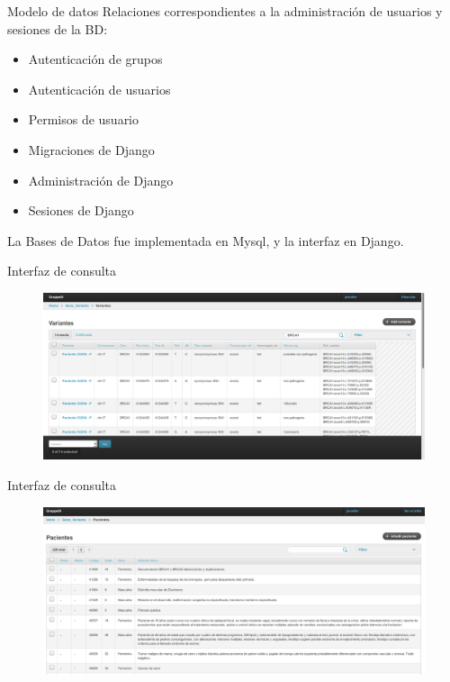 \documentclass[xcolor=dvipsnames]{beamer}
\begin{document}
\begin{frame}{Modelo de datos}
     Relaciones correspondientes a la administración de usuarios y sesiones de la BD:
    \begin{itemize}
    	\item Autenticación de grupos
    	\item Autenticación de usuarios
    	\item Permisos de usuario
    	\item Migraciones de Django 
    	\item Administración de Django
    	\item Sesiones de Django	 	
    \end{itemize}
La Bases de Datos fue implementada en Mysql, y la interfaz en Django.
\end{frame}

\begin{frame}{Interfaz de consulta}
	\begin{figure}
		\includegraphics[width=\textwidth]{consulta}
		\newline
	\end{figure}
\end{frame}

\begin{frame}{Interfaz de consulta}
	\begin{figure}
		\includegraphics[width=\textwidth]{consulta2}
		\newline
	\end{figure}
\end{frame}
\end{document}

